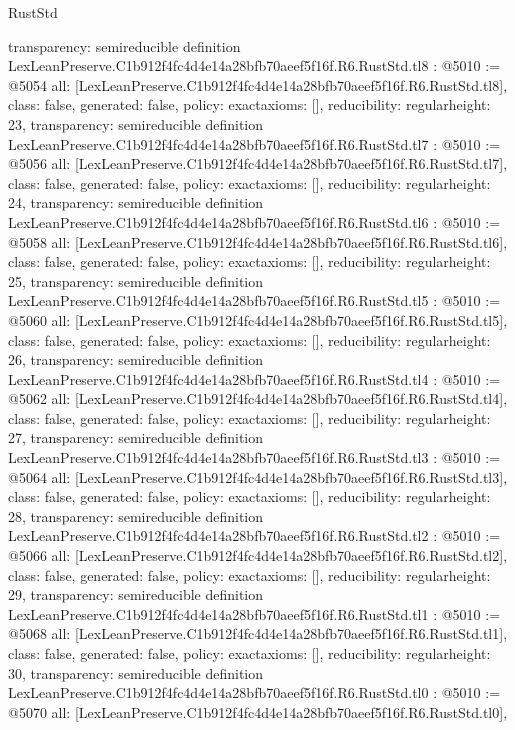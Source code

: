\begin{lexlean}{RustStd}
\begin{coremodule}
{  transparency: semireducible
}
definition LexLeanPreserve.C1b912f4fc4d4e14a28bfb70aeef5f16f.R6.RustStd.tl8 : @5010 := @5054 {
  all: [LexLeanPreserve.C1b912f4fc4d4e14a28bfb70aeef5f16f.R6.RustStd.tl8],
  class: false,
  generated: false,
  policy: exact{axioms: []},
  reducibility: regular{height: 23},
  transparency: semireducible
}
definition LexLeanPreserve.C1b912f4fc4d4e14a28bfb70aeef5f16f.R6.RustStd.tl7 : @5010 := @5056 {
  all: [LexLeanPreserve.C1b912f4fc4d4e14a28bfb70aeef5f16f.R6.RustStd.tl7],
  class: false,
  generated: false,
  policy: exact{axioms: []},
  reducibility: regular{height: 24},
  transparency: semireducible
}
definition LexLeanPreserve.C1b912f4fc4d4e14a28bfb70aeef5f16f.R6.RustStd.tl6 : @5010 := @5058 {
  all: [LexLeanPreserve.C1b912f4fc4d4e14a28bfb70aeef5f16f.R6.RustStd.tl6],
  class: false,
  generated: false,
  policy: exact{axioms: []},
  reducibility: regular{height: 25},
  transparency: semireducible
}
definition LexLeanPreserve.C1b912f4fc4d4e14a28bfb70aeef5f16f.R6.RustStd.tl5 : @5010 := @5060 {
  all: [LexLeanPreserve.C1b912f4fc4d4e14a28bfb70aeef5f16f.R6.RustStd.tl5],
  class: false,
  generated: false,
  policy: exact{axioms: []},
  reducibility: regular{height: 26},
  transparency: semireducible
}
definition LexLeanPreserve.C1b912f4fc4d4e14a28bfb70aeef5f16f.R6.RustStd.tl4 : @5010 := @5062 {
  all: [LexLeanPreserve.C1b912f4fc4d4e14a28bfb70aeef5f16f.R6.RustStd.tl4],
  class: false,
  generated: false,
  policy: exact{axioms: []},
  reducibility: regular{height: 27},
  transparency: semireducible
}
definition LexLeanPreserve.C1b912f4fc4d4e14a28bfb70aeef5f16f.R6.RustStd.tl3 : @5010 := @5064 {
  all: [LexLeanPreserve.C1b912f4fc4d4e14a28bfb70aeef5f16f.R6.RustStd.tl3],
  class: false,
  generated: false,
  policy: exact{axioms: []},
  reducibility: regular{height: 28},
  transparency: semireducible
}
definition LexLeanPreserve.C1b912f4fc4d4e14a28bfb70aeef5f16f.R6.RustStd.tl2 : @5010 := @5066 {
  all: [LexLeanPreserve.C1b912f4fc4d4e14a28bfb70aeef5f16f.R6.RustStd.tl2],
  class: false,
  generated: false,
  policy: exact{axioms: []},
  reducibility: regular{height: 29},
  transparency: semireducible
}
definition LexLeanPreserve.C1b912f4fc4d4e14a28bfb70aeef5f16f.R6.RustStd.tl1 : @5010 := @5068 {
  all: [LexLeanPreserve.C1b912f4fc4d4e14a28bfb70aeef5f16f.R6.RustStd.tl1],
  class: false,
  generated: false,
  policy: exact{axioms: []},
  reducibility: regular{height: 30},
  transparency: semireducible
}
definition LexLeanPreserve.C1b912f4fc4d4e14a28bfb70aeef5f16f.R6.RustStd.tl0 : @5010 := @5070 {
  all: [LexLeanPreserve.C1b912f4fc4d4e14a28bfb70aeef5f16f.R6.RustStd.tl0],
}
\end{coremodule}
\end{lexlean}
